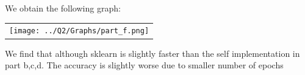 \begin{enumerate}[label=(\alph*)]
\begin{enumerate}[label=\roman*.]
          \end{enumerate}
          We obtain the following graph:
          \begin{center}
              \begin{tabular}{c}
                  \texttt{[image: ../Q2/Graphs/part\_f.png]}
              \end{tabular}
          \end{center}
          We find that although sklearn is slightly faster than the self implementation in part b,c,d. The accuracy is slightly worse due to smaller number of epochs

\end{enumerate}


